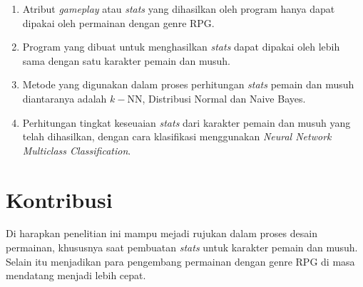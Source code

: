 \begin{enumerate}
	\item Atribut \textit{gameplay} atau \textit{stats} yang dihasilkan oleh program hanya dapat dipakai oleh permainan dengan genre RPG.
	
	\item Program yang dibuat untuk menghasilkan \textit{stats} dapat dipakai oleh lebih sama dengan satu karakter pemain dan musuh.

	\item Metode yang digunakan dalam proses perhitungan \textit{stats} pemain dan musuh diantaranya adalah $k-$NN, Distribusi Normal dan Naive Bayes.
	
	\item Perhitungan tingkat keseuaian \textit{stats} dari karakter pemain dan musuh yang telah dihasilkan, dengan cara klasifikasi menggunakan \textit{Neural Network Multiclass Classification}.
\end{enumerate}

\section{Kontribusi}
\vspace{1ex}

Di harapkan penelitian ini mampu mejadi rujukan dalam proses desain permainan, khususnya saat pembuatan \textit{stats} untuk karakter pemain dan musuh. Selain itu menjadikan para pengembang permainan dengan genre RPG di masa mendatang menjadi lebih cepat.

